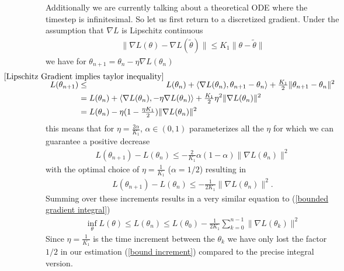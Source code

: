 Additionally we are currently talking about a theoretical ODE where the timestep
is infinitesimal. So let us first return to a discretized gradient. Under the
assumption that \(\nabla L\) is Lipschitz continuous
%
\begin{align*}
	\| \nabla L(\theta) - \nabla L(\tilde{\theta})\| \le K_1 \|\theta-\tilde{\theta}\|
\end{align*}
%
we have for \(\theta_{n+1}=\theta_n-\eta\nabla L(\theta_n)\)
%
\begin{align}
	L(\theta_{n+1})
	&\lxle{\ref{Lipschitz Gradient implies taylor inequality}} L(\theta_n) 
	+ \langle\nabla L(\theta_n),\theta_{n+1} - \theta_n\rangle
	+ \tfrac{K_1}{2} \| \theta_{n+1} - \theta_n\|^2 
	\label{bound increment}\\
	&= L(\theta_n)
	+ \langle\nabla L(\theta_n), -\eta\nabla L(\theta_n)\rangle
	+ \tfrac{K_1}{2}\eta^2\| \nabla L(\theta_n)\|^2
	\nonumber\\
	&=L(\theta_n) - \eta(1-\tfrac{\eta K_1}{2})\|\nabla L(\theta_n)\|^2
	\nonumber
\end{align}
%
this means that for \(\eta=\tfrac{2\alpha}{K_1}\), \(\alpha \in (0,1)\)
parameterizes all the \(\eta\) for which we can guarantee a positive decrease
%
\begin{align*}
	L(\theta_{n+1}) - L(\theta_n)
	\le - \tfrac{2}{K_1}\alpha (1-\alpha)\|\nabla L(\theta_n)\|^2
\end{align*}
%
with the optimal choice of \(\eta=\tfrac{1}{K_1}\) (\(\alpha=1/2\)) resulting
in 
%
\begin{align*}
	L(\theta_{n+1}) - L(\theta_n)
	\le - \tfrac{1}{2K_1}\|\nabla L(\theta_n)\|^2.
\end{align*}
%
Summing over these increments results in a very similar equation to
(\ref{bounded gradient integral})
%
\begin{align*}
	\inf_{\theta} L(\theta) \le L(\theta_n) 
	\le L(\theta_0) - \tfrac{1}{2K_1} \sum_{k=0}^{n-1}\|\nabla L(\theta_k)\|^2
\end{align*}
%
Since \(\eta=\tfrac{1}{K_1}\) is the time increment between the \(\theta_k\)
we have only lost the factor \(1/2\) in our estimation (\ref{bound increment})
compared to the precise integral version.

